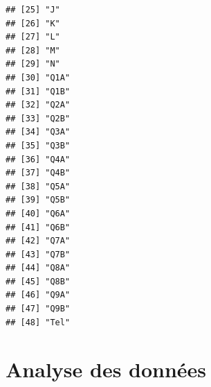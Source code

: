 \documentclass[12pt,english,french]{article}\usepackage{graphicx, color}
\makeatletter
\newenvironment{kframe}{%
 \def\at@end@of@kframe{}%
 \ifinner\ifhmode%
  \def\at@end@of@kframe{\end{minipage}}%
  \begin{minipage}{\columnwidth}%
 \fi\fi%
 \def\FrameCommand##1{\hskip\@totalleftmargin \hskip-\fboxsep
 \colorbox{shadecolor}{##1}\hskip-\fboxsep
     \hskip-\linewidth \hskip-\@totalleftmargin \hskip\columnwidth}%
 \MakeFramed {\advance\hsize-\width
   \@totalleftmargin\z@ \linewidth\hsize
   \@setminipage}}%
 {\par\unskip\endMakeFramed%
 \at@end@of@kframe}
\newenvironment{knitrout}{}{} %
\makeatother
\begin{document}
\begin{knitrout}
\begin{kframe}
\begin{verbatim}
## [25] "J"                                                                  
## [26] "K"                                                                  
## [27] "L"                                                                  
## [28] "M"                                                                  
## [29] "N"                                                                  
## [30] "Q1A"                                                                
## [31] "Q1B"                                                                
## [32] "Q2A"                                                                
## [33] "Q2B"                                                                
## [34] "Q3A"                                                                
## [35] "Q3B"                                                                
## [36] "Q4A"                                                                
## [37] "Q4B"                                                                
## [38] "Q5A"                                                                
## [39] "Q5B"                                                                
## [40] "Q6A"                                                                
## [41] "Q6B"                                                                
## [42] "Q7A"                                                                
## [43] "Q7B"                                                                
## [44] "Q8A"                                                                
## [45] "Q8B"                                                                
## [46] "Q9A"                                                                
## [47] "Q9B"                                                                
## [48] "Tel"
\end{verbatim}
\end{kframe}
\end{knitrout}


\section{Analyse des données}
\end{document}
